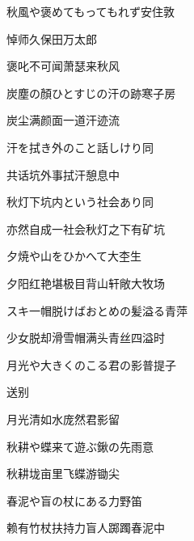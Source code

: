 \begin{haiku}
    {\FH 秋風や褒めてもってもれず}\hfill{\FH 安住敦}

    {\FK 悼师久保田万太郎}

    {\FK 褒叱不可闻萧瑟来秋风}
\end{haiku}

\begin{haiku}
    {\FH 炭塵の顏ひとすじの汗の跡}\hfill{\FH 寒子房}

    {\FK 炭尘满颜面一道汗迹流}
\end{haiku}

\begin{haiku}
    {\FH 汗を拭き外のこと話しけり}\hfill{\FH 同}

    {\FK 共话坑外事拭汗憩息中}
\end{haiku}

\begin{haiku}
    {\FH 秋灯下坑内という社会あり}\hfill{\FH 同}

    {\FK 亦然自成一社会秋灯之下有矿坑}
\end{haiku}

\begin{haiku}
    {\FH 夕焼や山をひかへて大}\hfill{\FH 杢生}

    {\FK 夕阳红艳堪极目背山轩敞大牧场}
\end{haiku}

\begin{haiku}
    {\FH スキ一帽脱けばおとめの髪溢る}\hfill{\FH 青萍}

    {\FK 少女脱却滑雪帽满头青丝四溢时}
\end{haiku}

\begin{haiku}
    {\FH 月光や大きくのこる君の影}\hfill{\FH 普提子}

    {\FK 送别}

    {\FK 月光清如水庞然君影留}
\end{haiku}

\begin{haiku}
    {\FH 秋耕や蝶来て遊ぶ鍬の先}\hfill{\FH 雨意}

    {\FK 秋耕垅亩里飞蝶游锄尖}
\end{haiku}

\begin{haiku}
    {\FH 春泥や盲の杖にある力}\hfill{\FH 野笛}

    {\FK 赖有竹杖扶持力盲人踯躅春泥中}
\end{haiku}

